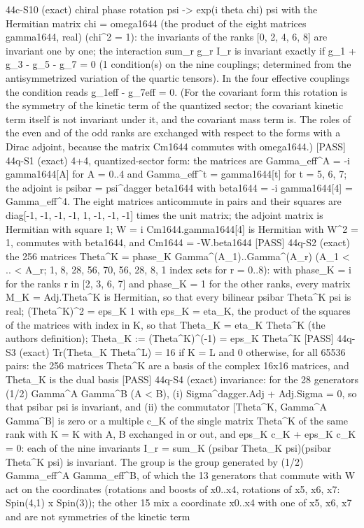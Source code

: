 \documentclass[
  10pt,
]{article}
\newenvironment{Shaded}{}{}
\newcommand{\NormalTok}[1]{#1}
\begin{document}
\begin{Shaded}
\begin{Highlighting}[]
\NormalTok{[PASS] 44c{-}S10  (exact) chiral phase rotation psi {-}\textgreater{} exp(i theta chi) psi with the Hermitian matrix chi = omega1644 (the product of the eight matrices gamma1644, real) (chi\^{}2 = 1): the invariants of the ranks [0, 2, 4, 6, 8] are invariant one by one; the interaction sum\_r g\_r I\_r is invariant exactly if g\_1 + g\_3 {-} g\_5 {-} g\_7 = 0 (1 condition(s) on the nine couplings; determined from the antisymmetrized variation of the quartic tensors). In the four effective couplings the condition reads g\_1eff {-} g\_7eff = 0. (For the covariant form this rotation is the symmetry of the kinetic term of the quantized sector; the covariant kinetic term itself is not invariant under it, and the covariant mass term is. The roles of the even and of the odd ranks are exchanged with respect to the forms with a Dirac adjoint, because the matrix Cm1644 commutes with omega1644.)}
\NormalTok{[PASS] 44q{-}S1  (exact) 4+4, quantized{-}sector form: the matrices are Gamma\_eff\^{}A = {-}i gamma1644[A] for A = 0..4 and Gamma\_eff\^{}t = gamma1644[t] for t = 5, 6, 7; the adjoint is psibar = psi\^{}dagger beta1644 with beta1644 = {-}i gamma1644[4] = Gamma\_eff\^{}4. The eight matrices anticommute in pairs and their squares are diag[{-}1, {-}1, {-}1, {-}1, 1, {-}1, {-}1, {-}1] times the unit matrix; the adjoint matrix is Hermitian with square 1; W = i Cm1644.gamma1644[4] is Hermitian with W\^{}2 = 1, commutes with beta1644, and Cm1644 = {-}W.beta1644}
\NormalTok{[PASS] 44q{-}S2  (exact) the 256 matrices Theta\^{}K = phase\_K Gamma\^{}(A\_1)..Gamma\^{}(A\_r) (A\_1 \textless{} .. \textless{} A\_r; 1, 8, 28, 56, 70, 56, 28, 8, 1 index sets for r = 0..8): with phase\_K = i for the ranks r in [2, 3, 6, 7] and phase\_K = 1 for the other ranks, every matrix M\_K = Adj.Theta\^{}K is Hermitian, so that every bilinear psibar Theta\^{}K psi is real; (Theta\^{}K)\^{}2 = eps\_K 1 with eps\_K = eta\_K, the product of the squares of the matrices with index in K, so that Theta\_K = eta\_K Theta\^{}K (the author\textquotesingle{}s definition); Theta\_K := (Theta\^{}K)\^{}({-}1) = eps\_K Theta\^{}K}
\NormalTok{[PASS] 44q{-}S3  (exact) Tr(Theta\_K Theta\^{}L) = 16 if K = L and 0 otherwise, for all 65536 pairs: the 256 matrices Theta\^{}K are a basis of the complex 16x16 matrices, and Theta\_K is the dual basis}
\NormalTok{[PASS] 44q{-}S4  (exact) invariance: for the 28 generators (1/2) Gamma\^{}A Gamma\^{}B (A \textless{} B), (i) Sigma\^{}dagger.Adj + Adj.Sigma = 0, so that psibar psi is invariant, and (ii) the commutator [Theta\^{}K, Gamma\^{}A Gamma\^{}B] is zero or a multiple c\_K of the single matrix Theta\^{}K\textquotesingle{} of the same rank with K\textquotesingle{} = K with A, B exchanged in or out, and eps\_K c\_K + eps\_K\textquotesingle{} c\_K\textquotesingle{} = 0: each of the nine invariants I\_r = sum\_K (psibar Theta\_K psi)(psibar Theta\^{}K psi) is invariant. The group is the group generated by (1/2) Gamma\_eff\^{}A Gamma\_eff\^{}B, of which the 13 generators that commute with W act on the coordinates (rotations and boosts of x0..x4, rotations of x5, x6, x7: Spin(4,1) x Spin(3)); the other 15 mix a coordinate x0..x4 with one of x5, x6, x7 and are not symmetries of the kinetic term}

\end{Highlighting}
\end{Shaded}
\end{document}
